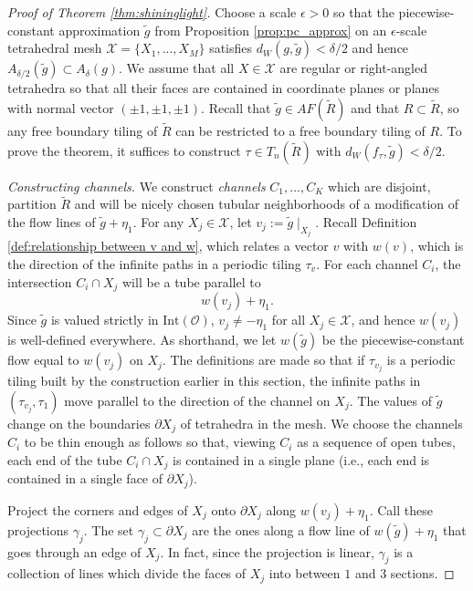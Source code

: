\documentclass[11pt]{article}
\theoremstyle{remark}
\theoremstyle{definition}
\newcommand{\mc}[1]{\mathcal{#1}}
\begin{document}
\begin{proof}[Proof of Theorem \ref{thm:shininglight}]

Choose a scale $\epsilon>0$ so that the piecewise-constant approximation $\widetilde g$ from Proposition \ref{prop:pc_approx} on an $\epsilon$-scale tetrahedral mesh $\mc X = \{X_1,...,X_M\}$ satisfies $d_W(g,\widetilde g) < \delta/2$ and hence $A_{\delta/2}(\widetilde g) \subset A_\delta(g)$. We assume that all $X\in \mc X$ are regular or right-angled tetrahedra so that all their faces are contained in coordinate planes or planes with normal vector $(\pm 1, \pm 1, \pm 1)$. Recall that $\widetilde g\in AF(\widetilde {R})$ and that $R\subset \widetilde R$, so any free boundary tiling of $\widetilde R$ can be restricted to a free boundary tiling of $R$. To prove the theorem, it suffices to construct $\tau \in T_n(\widetilde R)$ with $d_W(f_\tau, \widetilde g) <\delta/2$.
	
\textit{Constructing channels.} We construct \textit{channels} $C_1,...,C_K$ which are disjoint, partition $\widetilde R$ and will be nicely chosen tubular neighborhoods of a modification of the flow lines of $\widetilde g + \eta_1$. For any $X_j\in \mc X$, let $v_j := \widetilde g \mid_{X_j}$. Recall Definition \ref{def:relationship between v and w}, which relates a vector $v$ with $w(v)$, which is the direction of the infinite paths in a periodic tiling $\tau_v$. For each channel $C_i$, the intersection $C_i\cap X_j$ will be a tube parallel to $$w(v_j)+\eta_1.$$
Since $\widetilde g$ is valued strictly in $\text{Int}(\mc O)$, $v_j\neq -\eta_1$ for all $X_j\in \mc X$, and hence $w(v_j)$ is well-defined everywhere. As shorthand, we let $w(\widetilde g)$ be the piecewise-constant flow equal to $w(v_j)$ on $X_j$. The definitions are made so that if $\tau_{v_j}$ is a periodic tiling built by the construction earlier in this section, the infinite paths in $(\tau_{v_j},\tau_1)$ move parallel to the direction of the channel on $X_j$. The values of $\widetilde g$ change on the boundaries $\partial X_j$ of tetrahedra in the mesh. We choose the channels $C_i$ to be thin enough as follows so that, viewing $C_i$ as a sequence of open tubes, each end of the tube $C_i\cap X_j$ is contained in a single plane (i.e., each end is contained in a single face of $\partial X_j$).

Project the corners and edges of $X_j$ onto $\partial X_j$ along $w(v_j)+\eta_1$. Call these projections $\gamma_j$. The set $\gamma_j\subset \partial X_j$ are the ones along a flow line of $w(\widetilde g) + \eta_1$ that goes through an edge of $X_j$. In fact, since the projection is linear, $\gamma_j$ is a collection of lines which divide the faces of $X_j$ into between $1$ and $3$ sections. 


\end{proof}
\end{document}

